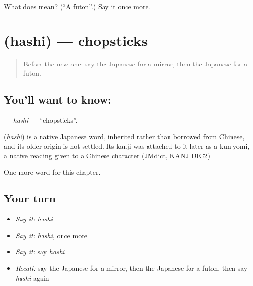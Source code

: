 \begin{tcolorbox}[breakable,colback=teal!4,colframe=teal!35!black,title={Before you move on}]
What does  mean? (\textquotedblleft{}A futon\textquotedblright{}.) Say it once more.
\end{tcolorbox}
\section[\texorpdfstring{\ja{はし} (hashi)}{はし (hashi)}]{ (hashi) — chopsticks}

\label{lesson:JA-C38-hashi}



\begin{quote}
Before the new one: say the Japanese for a mirror, then the Japanese for a futon.
\end{quote}

\subsection*{You'll want to know: }
\textbf{} — \emph{hashi} — \textquotedblleft{}chopsticks\textquotedblright{}.

\begin{cousinweb}
\textbf{} (\emph{hashi}) is a native Japanese word, inherited rather than borrowed from Chinese, and its older origin is not settled. Its kanji was attached to it later as a kun'yomi, a native reading given to a Chinese character (JMdict, KANJIDIC2).
\end{cousinweb}

\begin{grammarlens}[title={What you've built}]
One more word for this chapter.
\end{grammarlens}

\subsection*{Your turn}
\begin{itemize}
\raggedright
  \item \emph{Say it:} \emph{hashi}
  \item \emph{Say it:} \emph{hashi}, once more
  \item \emph{Say it:} say \emph{hashi}
  \item \emph{Recall:} say the Japanese for a mirror, then the Japanese for a futon, then say \emph{hashi} again
\end{itemize}

